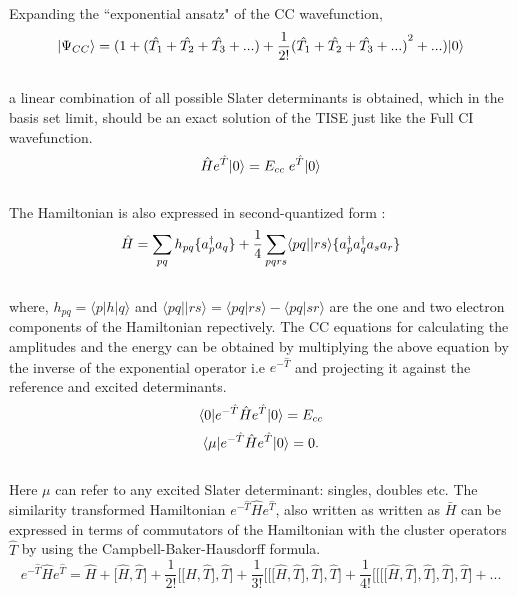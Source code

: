 Expanding the ``exponential ansatz" of the CC wavefunction,
\\
\begin{equation}
| \Psi_{CC} \rangle = (1+(\hat{T_1} + \hat{T_2} + \hat{T_3} + ... ) + \frac{1}{2!}{(\hat{T_1} + \hat{T_2} + \hat{T_3} + ...)}^2 + ... )| 0 \rangle
\end{equation}
\\
a linear combination of all possible Slater determinants is obtained, which in the basis set limit,  
should be an exact solution of the TISE just like the Full CI wavefunction. 
\\
\begin{equation}
\hat{H}e^{\hat{T}}| 0 \rangle = E_{cc}\;e^{\hat{T}}| 0 \rangle
\end{equation}
\\
The Hamiltonian is also expressed in second-quantized form \cite{Crawford00}:
\\
\begin{equation}
\hat{H} = \sum_{pq}h_{pq}\{a^\dagger_pa_q\} + \frac{1}{4}\sum_{pqrs}\langle pq || rs \rangle\{a^\dagger_pa^\dagger_qa_sa_r\}
\end{equation}
\\
where, $h_{pq} = \langle p|h|q \rangle$ and $\langle pq||rs \rangle = \langle pq|rs \rangle - \langle pq|sr \rangle$ are the one and two electron components of the Hamiltonian repectively.
The CC equations for calculating the amplitudes and the energy can be  
obtained by multiplying the above equation by the inverse of the exponential operator i.e
$e^{-\hat{T}}$ and projecting it against the reference and excited
determinants.
\\
\begin {equation}
\langle 0 |e^{-\hat{T}}\hat{H}e^{\hat{T}}| 0 \rangle = E_{cc}
\end{equation}
\begin{equation}
\langle \mu |e^{-\hat{T}}\hat{H}e^{\hat{T}}| 0 \rangle = 0 .
\end{equation} 
\\
Here $\mu$ can refer to any excited Slater determinant: singles, doubles etc. 
The similarity transformed Hamiltonian $e^{-\hat{T}}\hat{H}e^{\hat{T}}$, also written as 
written as $\bar{H}$ can be expressed in terms of commutators of the Hamiltonian with the 
cluster operators $\hat{T}$ by using the Campbell-Baker-Hausdorff formula\cite{Merzbacher70}.
\\
\begin{equation}
e^{-\hat{T}}\hat{H}e^{\hat{T}} = \hat{H} + \lbrack\hat{H},\hat{T}\rbrack + \frac{1}{2!}\lbrack\lbrack\hat{H},\hat{T}\rbrack,\hat{T}\rbrack + \frac{1}{3!}\lbrack\lbrack\lbrack\hat{H},\hat{T}\rbrack,\hat{T}\rbrack,\hat{T}\rbrack + \frac{1}{4!}\lbrack\lbrack\lbrack\lbrack\hat{H},\hat{T}\rbrack,\hat{T}\rbrack,\hat{T}\rbrack,\hat{T}\rbrack + ...
\end{equation}
